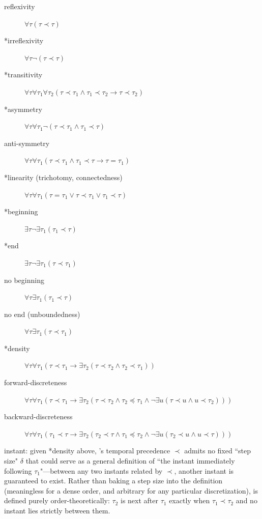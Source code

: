 \begin{description}
\item[reflexivity] $ \forall \tau(\tau\prec \tau)$
\item[*irreflexivity] $ \forall \tau\lnot (\tau\prec \tau)$
\item[*transitivity] $ \forall \tau\forall \tau_1\forall \tau_2(\tau\prec \tau_1\wedge \tau_1\prec \tau_2\rightarrow \tau\prec \tau_2)$
\item[*asymmetry] $ \forall \tau\forall \tau_1\lnot (\tau\prec \tau_1\wedge \tau_1\prec \tau)$
\item[anti-symmetry] $ \forall \tau\forall \tau_1(\tau\prec \tau_1\wedge \tau_1\prec \tau\rightarrow \tau=\tau_1)$
\item[*linearity (trichotomy, connectedness)] $ \forall \tau\forall \tau_1(\tau=\tau_1\vee \tau\prec \tau_1\vee \tau_1\prec \tau)$
\item[*beginning] $ \exists \tau\lnot \exists \tau_1(\tau_1\prec \tau)$
\item[*end] $ \exists \tau\lnot \exists \tau_1(\tau\prec \tau_1)$
\item[no beginning] $ \forall \tau\exists \tau_1(\tau_1\prec \tau)$
\item[no end (unboundedness)] $ \forall \tau\exists \tau_1(\tau\prec \tau_1)$
\item[*density] $ \forall \tau\forall \tau_1(\tau\prec \tau_1\rightarrow \exists \tau_2(\tau\prec \tau_2\wedge \tau_2\prec \tau_1))$
\item[forward-discreteness] $ \forall \tau\forall \tau_1(\tau\prec \tau_1\rightarrow \exists \tau_2(\tau\prec \tau_2\wedge \tau_2\preccurlyeq \tau_1\wedge \lnot \exists u(\tau\prec u\wedge u\prec \tau_2)))$
\item[backward-discreteness] $ \forall \tau\forall \tau_1(\tau_1\prec \tau\rightarrow \exists \tau_2(\tau_2\prec \tau\wedge \tau_1\preccurlyeq \tau_2\wedge \lnot \exists u(\tau_2\prec u\wedge u\prec \tau)))$
\end{description}

\pn {} instant: given *density above, \logicid's temporal precedence $\prec$ admits no fixed
``step size" $\delta$ that could serve as a general definition of ``the instant immediately following
$\tau_1$"---between any two instants related by $\prec$, another instant is guaranteed to exist.  Rather
than baking a step size into the definition (meaningless for a dense order, and arbitrary for any
particular discretization),  is defined purely order-theoretically: $\tau_2$ is next after
$\tau_1$ exactly when $\tau_1 \prec \tau_2$ and no instant lies strictly between them.

